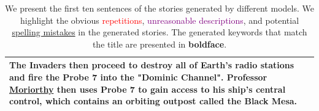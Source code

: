 \documentclass[11pt]{article}
\begin{document}
\begin{table}[t!]
\begin{tabularx}{2\columnwidth}{l|X}
The Invaders then proceed to destroy all of Earth's radio stations and fire the \textbf{Probe 7} into the "Dominic Channel". 
Professor \underline{Moriorthy} then uses \textbf{Probe 7} to gain access to his ship's central control, which contains an orbiting outpost called the Black Mesa. \\
    \bottomrule[1pt]
    \end{tabularx}
    \caption{We present the first ten sentences of the stories generated by different models. We highlight the obvious \textcolor{red}{repetitions}, \textcolor{purple}{unreasonable descriptions}, and potential \underline{spelling mistakes} in the generated stories. The generated keywords that match the title are presented in \textbf{boldface}.}
    \label{tab:gen_example}
\end{table}


\end{document}

